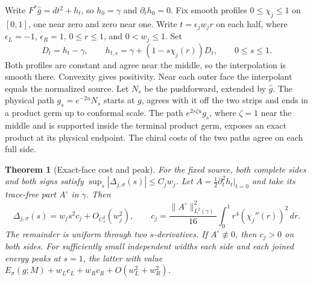 \documentclass[11pt,letterpaper]{article}
\numberwithin{equation}{section}
\newtheorem{theorem}{Theorem}[section]
\newcommand{\rd}{\gamma}
\begin{document}
Write \(F^*\widehat g=dt^2+h_t\), so \(h_0=\rd\) and
\(\partial_t h_0=0\). Fix smooth profiles \(0\le\chi_j\le1\)
on \([0,1]\), one near zero and zero near one. Write \(t=\epsilon_j w_j r\)
on each half, where \(\epsilon_L=-1\), \(\epsilon_R=1\),
\(0\le r\le1\), and \(0<w_j\le1\). Set
\begin{equation}
 D_t=h_t-\rd,\qquad h_{t,s}=\rd+(1-s\chi_j(r))D_t,
 \qquad 0\le s\le1 .
 \label{eq:exact-path}
\end{equation}
Both profiles are constant and agree near the middle, so the
interpolation is smooth there. Convexity gives positivity. Near
each outer face the interpolant equals the normalized source.
Let \(N_s\) be the pushforward, extended by \(\widehat g\). The
physical path \(g_s=e^{-2u}N_s\) starts at \(g\), agrees with it
off the two strips and ends in a product germ up to conformal
scale. The path \(e^{2s\zeta u}g_s\), where \(\zeta=1\) near the
middle and is supported inside the terminal product germ, exposes
an exact product at its physical endpoint. The chiral costs of
the two paths agree on each full side.

\begin{theorem}[Exact-face cost and peak]\label{thm:exact}
For the fixed source, both complete sides and both signs satisfy
\(\sup_s|\Delta_{j,\sigma}(s)|\le C_j w_j\).
Let \(A=\tfrac12\partial_t^2h_t|_{t=0}\) and take its trace-free
part \(A^\circ\) in \(\rd\). Then
\begin{equation}
 \Delta_{j,\sigma}(s)=w_j s^2 c_j+O_{C_s^2}(w_j^2),\qquad
 c_j=\frac{\|A^\circ\|_{L^2(\rd)}^2}{16}
       \int_0^1 r^4(\chi_j''(r))^2\,dr .
 \label{eq:exact-coefficient}
\end{equation}
The remainder is uniform through two \(s\)-derivatives. If
\(A^\circ\not\equiv0\), then \(c_j>0\) on both sides. For
sufficiently small independent widths each side and each joined
energy peaks at \(s=1\), the latter with value
\(E_\sigma(g;M)+w_Lc_L+w_Rc_R+O(w_L^2+w_R^2)\).
\end{theorem}
\end{document}
